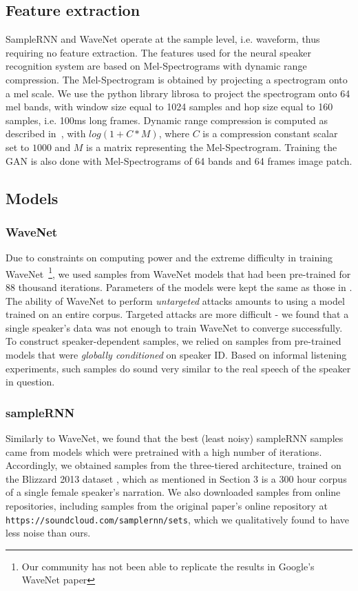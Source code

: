 \subsection{Feature extraction}
SampleRNN and WaveNet operate at the sample level, i.e. waveform, thus requiring
no feature extraction. The features used for the neural speaker recognition
system are based on Mel-Spectrograms with dynamic range compression. The
Mel-Spectrogram is obtained by projecting a spectrogram onto a mel scale. We use
the python library librosa to project the spectrogram
onto 64 mel bands, with window size equal to 1024 samples and hop size equal to
160 samples, i.e. 100ms long frames. Dynamic range compression is computed as
described in~\cite{lukic2016speaker}, with $log(1 + C*M)$, where $C$ is a
compression constant scalar set to $1000$ and $M$ is a matrix representing the
Mel-Spectrogram. Training the GAN is also done with Mel-Spectrograms of 64 bands and 64 frames image patch.
                        
\subsection{Models}
\subsubsection{WaveNet}
Due to constraints on computing power and the extreme difficulty in training
WaveNet~\footnote{Our community has not been able to replicate the results in
Google's WaveNet paper}, we used samples from WaveNet models that had been
pre-trained for 88 thousand iterations. Parameters of the models were kept the
same as those in \cite{van2016wavenet}. \\ The ability of WaveNet to perform
\textit{untargeted} attacks amounts to using a model trained on an entire
corpus. Targeted attacks are more difficult - we found that a single speaker's
data was not enough to train WaveNet to converge successfully. To construct
speaker-dependent samples, we relied on samples from pre-trained models that
were \textit{globally conditioned} on speaker ID. Based on informal listening
experiments, such samples do sound very similar to the real speech of the
speaker in question.  

\subsubsection{sampleRNN}
Similarly to WaveNet, we found that the best (least noisy) sampleRNN samples
came from models which were pretrained with a high number of iterations.
Accordingly, we obtained samples from the three-tiered architecture, trained on
the Blizzard 2013 dataset \cite{prahallad2013blizzard}, which as mentioned in
Section 3 is a 300 hour corpus of a single female speaker's narration. We also
downloaded samples from online repositories, including samples from the original
paper's online repository at \texttt{https://soundcloud.com/samplernn/sets},
which we qualitatively found to have less noise than ours. 

